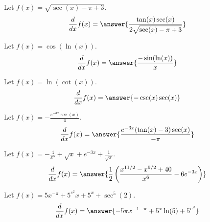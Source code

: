 \documentclass{ximera}
\begin{document}
\begin{shuffle}
\begin{exercise}
Let $f(x)=\sqrt{\sec (x)-\pi +3}$.
\[
\ddx f(x) = \answer{\frac{\tan (x) \sec (x)}{2 \sqrt{\sec (x)-\pi +3}}}
\]
\end{exercise}

\begin{exercise}
Let $f(x)=\cos (\ln (x))$.
\[
\ddx f(x) = \answer{\frac{-\sin (\ln (x))}{x}}
\]
\end{exercise}

\begin{exercise}
Let $f(x)=\ln (\cot (x))$.
\[
\ddx f(x) = \answer{-\csc (x) \sec (x)}
\]
\end{exercise}

\begin{exercise}
Let $f(x)=-\frac{e^{-3 x} \sec (x)}{\pi }$.
\[
\ddx f(x) = \answer{\frac{e^{-3 x} (\tan (x)-3) \sec (x)}{-\pi }}
\]
\end{exercise}

\begin{exercise}
Let $f(x)=-\frac{4}{x^5}+\sqrt{x}+e^{-3 x}+\frac{1}{\sqrt{x}}$.
\[
\ddx f(x) = \answer{\frac{1}{2} \left(\frac{x^{11/2}-x^{9/2}+40}{x^6}-6 e^{-3 x}\right)}
\]
\end{exercise}


\begin{exercise}
Let $f(x)=5 x^{-\pi }+5^{e^2} x+5^x+\sec ^5(2)$.
\[
\ddx f(x) = \answer{-5 \pi  x^{-1-\pi }+5^x \ln (5)+5^{e^2}}
\]
\end{exercise}




\end{shuffle}
\end{document}
